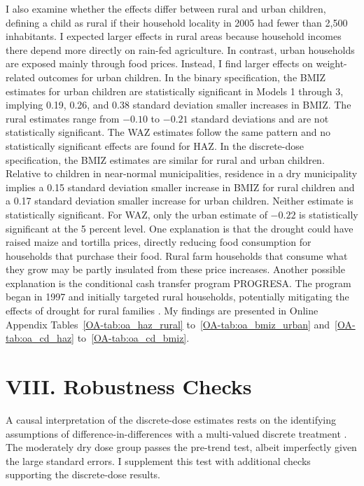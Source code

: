\documentclass[12pt]{article}
\begin{document}
I also examine whether the effects differ between rural and urban children, defining a child as rural if their household locality in 2005 had fewer than 2,500 inhabitants. I expected larger effects in rural areas because household incomes there depend more directly on rain-fed agriculture. In contrast, urban households are exposed mainly through food prices. Instead, I find larger effects on weight-related outcomes for urban children. In the binary specification, the BMIZ estimates for urban children are statistically significant in Models 1 through 3, implying 0.19, 0.26, and 0.38 standard deviation smaller increases in BMIZ. The rural estimates range from $-0.10$ to $-0.21$ standard deviations and are not statistically significant. The WAZ estimates follow the same pattern and no statistically significant effects are found for HAZ. In the discrete-dose specification, the BMIZ estimates are similar for rural and urban children. Relative to children in near-normal municipalities, residence in a dry municipality implies a 0.15 standard deviation smaller increase in BMIZ for rural children and a 0.17 standard deviation smaller increase for urban children. Neither estimate is statistically significant. For WAZ, only the urban estimate of $-0.22$ is statistically significant at the 5 percent level. One explanation is that the drought could have raised maize and tortilla prices, directly reducing food consumption for households that purchase their food. Rural farm households that consume what they grow may be partly insulated from these price increases. Another possible explanation is the conditional cash transfer program PROGRESA. The program began in 1997 and initially targeted rural households, potentially mitigating the effects of drought for rural families \parencite{adhvaryuHelpingChildrenCatch2024}. My findings are presented in Online Appendix Tables~\ref{OA-tab:oa_haz_rural} to~\ref{OA-tab:oa_bmiz_urban} and~\ref{OA-tab:oa_cd_haz} to~\ref{OA-tab:oa_cd_bmiz}.

\section*{VIII. Robustness Checks}\label{sec:VIII}

A causal interpretation of the discrete-dose estimates rests on the identifying assumptions of difference-in-differences with a multi-valued discrete treatment \parencite{callawayDifferenceinDifferencesContinuousTreatment2024}. The moderately dry dose group passes the pre-trend test, albeit imperfectly given the large standard errors. I supplement this test with additional checks supporting the discrete-dose results.
\end{document}

